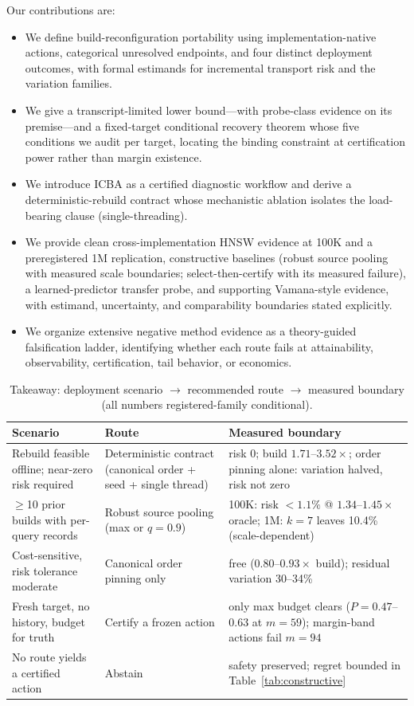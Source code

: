 \documentclass{article}
\begin{document}
Our contributions are:
\begin{itemize}\itemsep1pt
\item We define build-reconfiguration portability using implementation-native actions, categorical
unresolved endpoints, and four distinct deployment outcomes, with formal estimands for incremental
transport risk and the variation families.
\item We give a transcript-limited lower bound---with probe-class evidence on its premise---and a
fixed-target conditional recovery theorem whose five conditions we audit per target, locating the binding
constraint at certification power rather than margin existence.
\item We introduce ICBA as a certified diagnostic workflow and derive a deterministic-rebuild contract whose
mechanistic ablation isolates the load-bearing clause (single-threading).
\item We provide clean cross-implementation HNSW evidence at 100K and a preregistered 1M replication,
constructive baselines (robust source pooling with measured scale boundaries; select-then-certify with its
measured failure), a learned-predictor transfer probe, and supporting Vamana-style evidence, with estimand,
uncertainty, and comparability boundaries stated explicitly.
\item We organize extensive negative method evidence as a theory-guided falsification ladder, identifying
whether each route fails at attainability, observability, certification, tail behavior, or economics.
\end{itemize}

\begin{table}[t]
\centering
\caption{Takeaway: deployment scenario $\rightarrow$ recommended route $\rightarrow$ measured boundary (all numbers registered-family conditional).}
\label{tab:takeaway}
\footnotesize
\setlength{\tabcolsep}{3pt}
\begin{tabular}{p{3.2cm}p{3.9cm}p{6.5cm}}
\toprule
Scenario & Route & Measured boundary \\
\midrule
Rebuild feasible offline; near-zero risk required & Deterministic contract (canonical order + seed + single thread) & risk 0; build $1.71$--$3.52\times$; order pinning alone: variation halved, risk not zero \\
$\ge$10 prior builds with per-query records & Robust source pooling (max or $q{=}0.9$) & 100K: risk $<1.1\%$ @ $1.34$--$1.45\times$ oracle; 1M: $k{=}7$ leaves 10.4\% (scale-dependent) \\
Cost-sensitive, risk tolerance moderate & Canonical order pinning only & free ($0.80$--$0.93\times$ build); residual variation 30--34\% \\
Fresh target, no history, budget for truth & Certify a frozen action & only max budget clears ($P{=}0.47$--$0.63$ at $m{=}59$); margin-band actions fail $m{=}94$ \\
No route yields a certified action & Abstain & safety preserved; regret bounded in Table~\ref{tab:constructive} \\
\bottomrule
\end{tabular}
\end{table}
\end{document}
